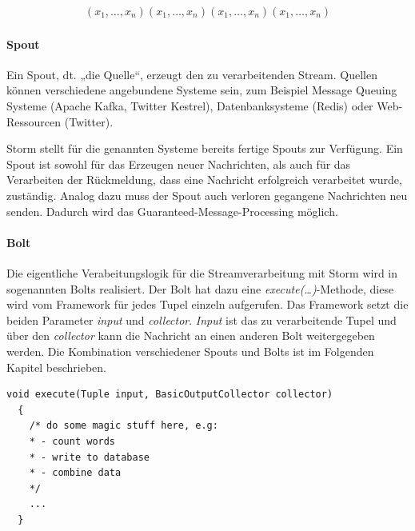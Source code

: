 \documentclass[a4paper,11pt]{scrartcl}
\begin{document}
  \begin{align*}
    (x_1, \ldots , x_n)
    (x_1, \ldots , x_n)
    (x_1, \ldots , x_n)
    (x_1, \ldots , x_n)
  \end{align*}
  \begin{figure}[!h]
    \centering
    \vspace*{-1cm}
  \end{figure}

  \paragraph{Spout}
  Ein Spout, dt. „die Quelle“, erzeugt den zu verarbeitenden Stream.
  Quellen können verschiedene angebundene Systeme sein, zum
  Beispiel Message Queuing Systeme (Apache Kafka, Twitter Kestrel),
  Datenbanksysteme (Redis) oder Web-Ressourcen (Twitter).

  Storm stellt für die genannten Systeme bereits fertige Spouts zur
  Verfügung. Ein Spout ist sowohl für das Erzeugen neuer Nachrichten,
  als auch für das Verarbeiten der Rückmeldung, dass eine Nachricht
  erfolgreich verarbeitet wurde, zuständig. Analog dazu muss der Spout
  auch verloren gegangene Nachrichten neu senden. Dadurch wird das
  Guaranteed-Message-Processing möglich.


  \paragraph{Bolt}
  Die eigentliche Verabeitungslogik für die Streamverarbeitung mit
  Storm wird in sogenannten Bolts realisiert. Der Bolt hat dazu eine
  \textit{execute(\ldots)}-Methode, diese wird vom Framework für jedes
  Tupel einzeln aufgerufen. Das Framework setzt die beiden Parameter
  \textit{input} und \textit{collector}. \textit{Input} ist das zu
  verarbeitende Tupel und über den \textit{collector} kann die
  Nachricht an einen anderen Bolt weitergegeben werden. Die
  Kombination verschiedener Spouts und Bolts ist im Folgenden Kapitel
  beschrieben.

  \begin{lstlisting}[caption={Methodensignatur einer Bolt-Implementierung}]
  void execute(Tuple input, BasicOutputCollector collector)
  {
    /* do some magic stuff here, e.g:
    * - count words
    * - write to database
    * - combine data
    */
    ...
  }
  \end{lstlisting}
\end{document}
